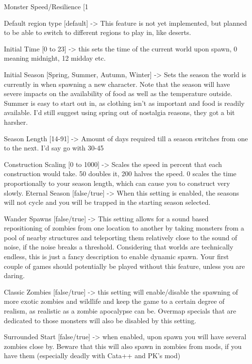 \documentclass[11pt]{report}
\begin{document}
Monster Speed/Resilience [1%

Default region type [default] -> This feature is not yet implemented, but planned to be able to switch to different regions to play in, like deserts.

Initial Time [0 to 23] -> this sets the time of the current world upon spawn, 0 meaning midnight, 12 midday etc.

Initial Season [Spring, Summer, Autumn, Winter] -> Sets the season the world is currently in when spawning a new character. Note that the season will have severe impacts on the availability of food as well as the temperature outside. Summer is easy to start out in, as clothing isn't as important and food is readily available. I'd still suggest using spring out of nostalgia reasons, they got a bit harsher.

Season Length [14-91] -> Amount of days required till a season switches from one to the next. I'd say go with 30-45

Construction Scaling [0 to 1000] -> Scales the speed in percent that each construction would take. 50 doubles it, 200 halves the speed. 0 scales the time proportionally to your season length, which can cause you to construct very slowly.
Eternal Season [false/true] -> When this setting is enabled, the seasons will not cycle and you will be trapped in the starting season selected.

Wander Spawns [false/true] -> This setting allows for a sound based repositioning of zombies from one location to another by taking monsters from a pool of nearby structures and teleporting them relatively close to the sound of noise, if the noise breaks a threshold. Considering that worlds are technically endless, this is just a fancy description to enable dynamic spawn. Your first couple of games should potentially be played without this feature, unless you are daring.

Classic Zombies [false/true] -> this setting will enable/disable the spawning of more exotic zombies and wildlife and keep the game to a certain degree of realism, as realistic as a zombie apocalypse can be. Overmap specials that are dedicated to those monsters will also be disabled by this setting.

Surrounded Start [false/true] -> when enabled, upon spawn you will have several zombies close by. Beware that this will also spawn in zombies from mods, if you have them (especially deadly with Cata++ and PK's mod)
\end{document}
